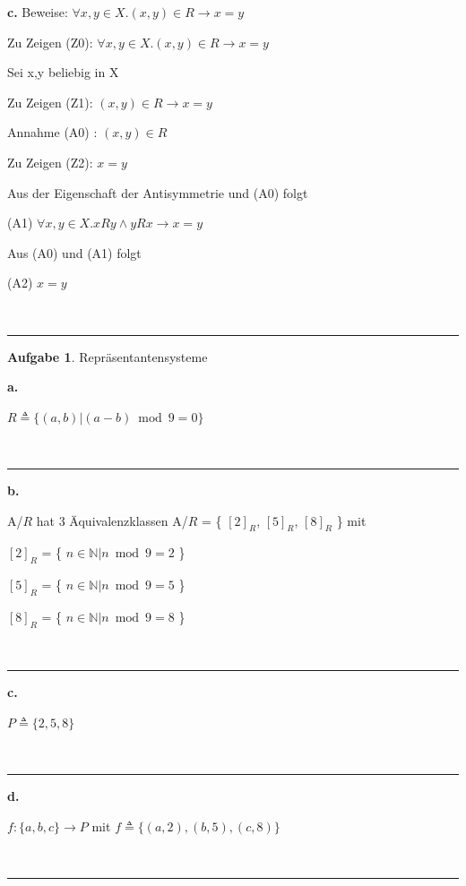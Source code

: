 \documentclass[10pt,leqno ]{article}
\theoremstyle{definition}
\newtheorem{problem}[theorem]{Aufgabe}
\newenvironment{solution}[1][L]{\begin{doublespace}\textbf{#1.}\quad }{\ \rule{0.5em}{0.5em}\end{doublespace}}
\begin{document}
\begin{solution}[c]
    Beweise: \( \forall x,y \in X. (x,y)\in R \rightarrow x=y \)

    Zu Zeigen (Z0):  \( \forall x,y \in X. (x,y)\in R \rightarrow x=y \)

    Sei x,y beliebig in X

    Zu Zeigen (Z1): \( (x,y) \in R \rightarrow x=y \)

    Annahme (A0) : \( (x,y) \in R \)

    Zu Zeigen (Z2): \( x=y \)
    
    Aus der Eigenschaft der Antisymmetrie und (A0) folgt

    (A1) \( \forall x,y \in X. xRy \land yRx \rightarrow x=y \)

    Aus (A0) und (A1) folgt

    (A2) \( x = y \)

\end{solution}


\begin{problem}
    Repräsentantensysteme
\end{problem}

\begin{solution}[a]

    \(R \triangleq \{ (a,b) | (a-b) \bmod 9 = 0 \} \)

\end{solution}

\begin{solution}[b]
    
    A/$R$ hat 3 Äquivalenzklassen
    A/$R$ = \{ $[2]_R$, $[5]_R$, $[8]_R$ \} mit 

    $[2]_R$ = \{ \( n \in \mathbb{N} | n \bmod 9 = 2 \) \}

    $[5]_R$ = \{ \( n \in \mathbb{N} | n \bmod 9 = 5 \) \}

    $[8]_R$ = \{ \( n \in \mathbb{N} | n \bmod 9 = 8 \) \}

\end{solution}

\begin{solution}[c] 

    \( P \triangleq \{ 2,5,8 \} \)
    
\end{solution}

\begin{solution}[d]

    \( f: \{ a,b,c \} \rightarrow P \) mit \(f \triangleq \{ (a,2), (b,5), (c,8) \}\)
    
\end{solution}
\end{document}

